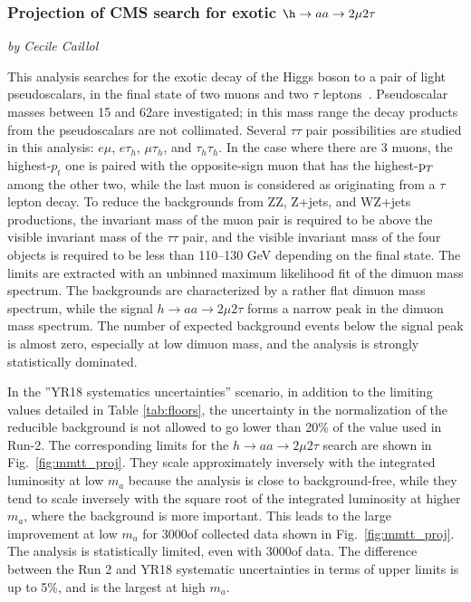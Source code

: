\subsubsection{Projection of CMS search for exotic $\h\to aa \to 2\mu 2\tau$}
\begin{center}
 {\it{ by Cecile Caillol}}
\end{center}


This analysis searches for the exotic decay of the Higgs boson to a pair of light pseudoscalars, in the
final state of two muons and two $\tau$ leptons~\cite{Sirunyan:2018mbx}. Pseudoscalar
masses between 15 and 62\GeV are investigated; in this mass range the decay products from the pseudoscalars are
not collimated.
Several $\tau\tau$ pair possibilities are studied in this analysis: $e\mu$, $e\tau_h$,
$\mu\tau_h$, and $\tau_h\tau_h$. In the case where there are 3 muons, the highest-$p_t$ one is paired with
the opposite-sign muon that has the highest-$\mathrm{p}_{T}$ among the other two, while the last muon is considered as
originating from a $\tau$ lepton decay.
To reduce the backgrounds from ZZ, Z+jets, and WZ+jets productions, the invariant mass of the muon pair
is required to be above the visible invariant mass of the $\tau\tau$ pair, and the
visible invariant mass of the four objects is required to be less than 110--130 GeV depending on the final state.
The limits are extracted with an unbinned maximum likelihood fit of the dimuon mass spectrum.
The backgrounds are characterized by a rather flat dimuon mass spectrum, while the signal $h\to aa \to 2\mu2\tau$
forms a narrow peak in the dimuon mass spectrum.
The number of expected background events below the signal peak is almost zero,
especially at low dimuon mass, and the analysis is strongly statistically dominated.

In the ''YR18 systematics uncertainties'' scenario, in addition to the limiting values detailed in Table \ref{tab:floors}, the uncertainty in the normalization of the reducible background is not allowed to go lower than 20\% of the value used in Run-2. The corresponding limits for the $h \to aa \to 2\mu2\tau$ search are shown in Fig.~\ref{fig:mmtt_proj}.
They scale approximately inversely with the integrated luminosity at low $m_a$ because the
analysis is close to background-free, while they tend to scale inversely with the square root of the integrated luminosity at higher $m_a$, where the background is more important. This leads to the large improvement at low $m_a$ for 3000\fbinv of collected data shown in Fig.~\ref{fig:mmtt_proj}. The analysis is statistically limited, even with 3000\fbinv of data. The difference between the Run 2 and YR18 systematic uncertainties in terms of upper limits
is up to 5\%, and is the largest at high $m_a$.

